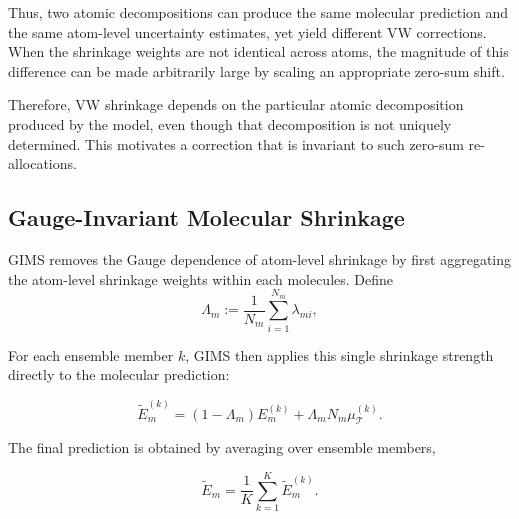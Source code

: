 \documentclass{article}
\begin{document}
Thus, two atomic decompositions can produce the same molecular prediction and the same atom-level uncertainty estimates, yet yield different VW corrections. When the shrinkage weights are not identical across atoms, the magnitude of this difference can be made arbitrarily large by scaling an appropriate zero-sum shift.

Therefore, VW shrinkage depends on the particular atomic decomposition produced by the model, even though that decomposition is not uniquely determined. This motivates a correction that is invariant to such zero-sum re-allocations.




\subsection{Gauge-Invariant Molecular Shrinkage}
GIMS removes the Gauge dependence of atom-level shrinkage by first aggregating the atom-level shrinkage weights within each molecules. Define
$$
\Lambda_m := \frac{1}{N_m}\sum_{i=1}^{N_m}\lambda_{mi} ,
$$

For each ensemble member $k$, GIMS then applies this single shrinkage
strength directly to the molecular prediction:

$$
\widetilde{E}_m^{(k)}
=
(1-\Lambda_m)E_m^{(k)}
+
\Lambda_m N_m \mu_{\mathcal T}^{(k)}.
$$

The final prediction is obtained by averaging over ensemble members,

$$
\widetilde{E}_m
=
\frac{1}{K}
\sum_{k=1}^{K}
\widetilde{E}_m^{(k)}.
$$
\end{document}

